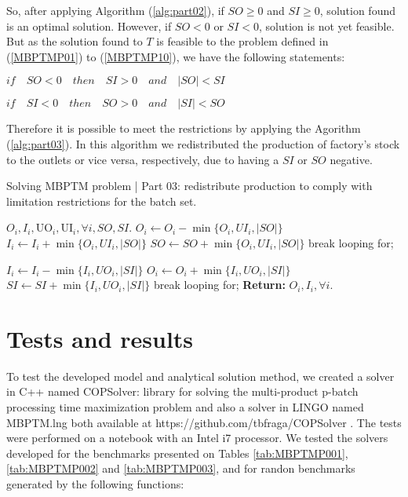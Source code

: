 \documentclass[authoryear,manuscript,12pt]{elsarticle}
\begin{document}
So, after applying Algorithm (\ref{alg:part02}), if $SO \geq 0$ and $SI \geq 0$, solution found is an optimal solution. However, if $SO < 0$ or $SI <0$, solution is not yet feasible. But as the solution found to $T$ is feasible to the problem defined in (\ref{MBPTMP01}) to (\ref{MBPTMP10}), we have the following statements:

$if \quad SO < 0 \quad then \quad SI > 0 \quad and  \quad |SO| < SI$

$if \quad SI < 0 \quad then \quad SO > 0 \quad and  \quad |SI| < SO$

Therefore it is possible to meet the restrictions by applying the Agorithm (\ref{alg:part03}). In this algorithm we redistributed the production of factory's stock to the outlets or vice versa, respectively, due to having a $SI$ or $SO$ negative.

\begin{algorithm}
\caption{Solving MBPTM problem | Part 03: redistribute production to comply with limitation restrictions for the batch set.}\label{alg:part03}
\begin{algorithmic}
\Require $O_i, I_i, \textrm{UO}_i, \textrm{UI}_i, \forall i, SO, SI$.
	\State $O_i \gets O_i - \min\{ O_i, UI_i, |SO|\}$
	\State $I_i \gets I_i + \min\{ O_i, UI_i, |SO|\}$
	\State $SO \gets SO + \min\{ O_i, UI_i, |SO|\}$
		break looping for;
	\EndIf
\EndFor
\EndIf

	\State $I_i \gets I_i - \min\{ I_i, UO_i, |SI|\}$
	\State $O_i \gets O_i + \min\{ I_i, UO_i, |SI|\}$
	\State $SI \gets SI + \min\{ I_i, UO_i, |SI|\}$
		break looping for;
	\EndIf
\EndFor
\EndIf
\State \textbf{Return:} $O_i, I_i, \forall i$.
\end{algorithmic}
\end{algorithm}

\section{Tests and results}
\label{sec:results}

To test the developed model and analytical solution method, we created a solver in C++ named COPSolver: library for solving the multi-product p-batch processing time maximization problem and also a solver in LINGO named MBPTM.lng both available at https://github.com/tbfraga/COPSolver \citep{Fraga2023}. The tests were performed on a notebook with an Intel i7 processor. We tested the solvers developed for the benchmarks presented on Tables \ref{tab:MBPTMP001}, \ref{tab:MBPTMP002} and \ref{tab:MBPTMP003}, and for randon benchmarks generated by the following functions: \\
\end{document}
